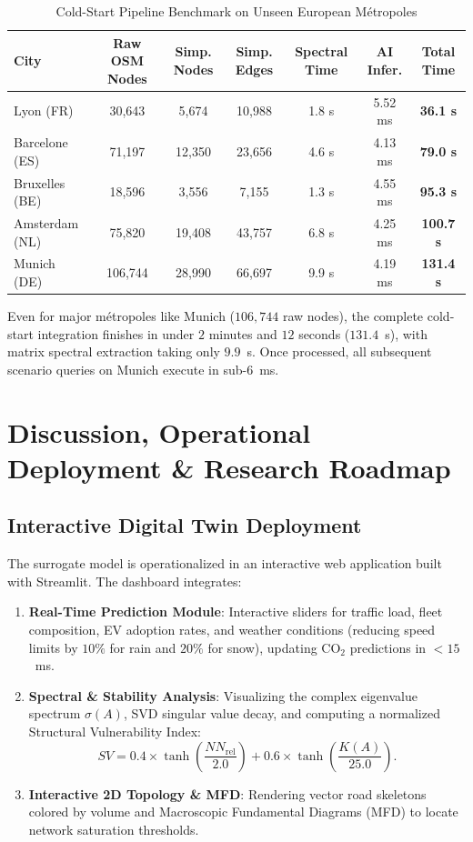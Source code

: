 \documentclass[lettersize,journal]{IEEEtran}
\begin{document}
\begin{table}[htbp]
\caption{Cold-Start Pipeline Benchmark on Unseen European Métropoles}
\label{tab:cold_start}
\centering
\begin{tabular}{lcccccc}
\toprule
City & Raw OSM Nodes & Simp. Nodes & Simp. Edges & Spectral Time & AI Infer. & Total Time \\
\midrule
Lyon (FR) & 30,643 & 5,674 & 10,988 & 1.8 s & 5.52 ms & \textbf{36.1 s} \\
Barcelone (ES) & 71,197 & 12,350 & 23,656 & 4.6 s & 4.13 ms & \textbf{79.0 s} \\
Bruxelles (BE) & 18,596 & 3,556 & 7,155 & 1.3 s & 4.55 ms & \textbf{95.3 s} \\
Amsterdam (NL) & 75,820 & 19,408 & 43,757 & 6.8 s & 4.25 ms & \textbf{100.7 s} \\
Munich (DE) & 106,744 & 28,990 & 66,697 & 9.9 s & 4.19 ms & \textbf{131.4 s} \\
\bottomrule
\end{tabular}
\end{table}

Even for major métropoles like Munich ($106,744$ raw nodes), the complete cold-start integration finishes in under $2$ minutes and $12$ seconds ($131.4$~s), with matrix spectral extraction taking only $9.9$~s. Once processed, all subsequent scenario queries on Munich execute in sub-6~ms.

\section{Discussion, Operational Deployment \& Research Roadmap}

\subsection{Interactive Digital Twin Deployment}
The surrogate model is operationalized in an interactive web application built with Streamlit. The dashboard integrates:
\begin{enumerate}
    \item \textbf{Real-Time Prediction Module}: Interactive sliders for traffic load, fleet composition, EV adoption rates, and weather conditions (reducing speed limits by $10\%$ for rain and $20\%$ for snow), updating $\text{CO}_2$ predictions in $<15$~ms.
    \item \textbf{Spectral \& Stability Analysis}: Visualizing the complex eigenvalue spectrum $\sigma(A)$, SVD singular value decay, and computing a normalized Structural Vulnerability Index:
    \begin{equation}
    SV = 0.4 \times \tanh\left( \frac{NN_{\text{rel}}}{2.0} \right) + 0.6 \times \tanh\left( \frac{K(A)}{25.0} \right).
    \end{equation}
    \item \textbf{Interactive 2D Topology \& MFD}: Rendering vector road skeletons colored by volume and Macroscopic Fundamental Diagrams (MFD) to locate network saturation thresholds.
\end{enumerate}
\end{document}
